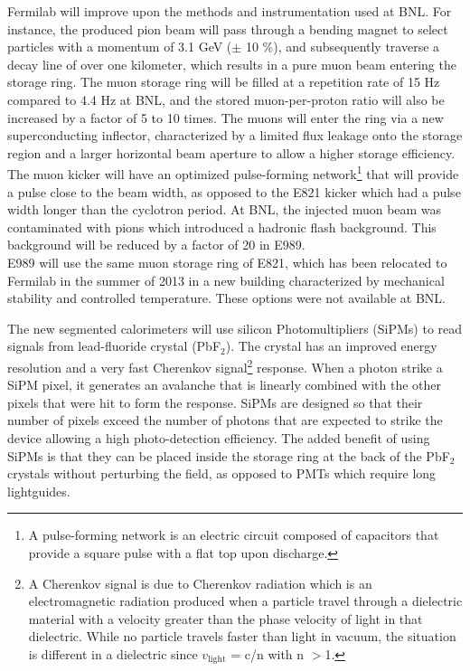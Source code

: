 \documentclass{outhesis}
\begin{document}
Fermilab will improve upon the methods and instrumentation used at BNL. For instance, the produced pion beam will pass through a bending magnet to select particles with a momentum of 3.1 GeV ($\pm$ 10 \%), and subsequently traverse a decay line of over one kilometer, which results in a pure muon beam entering the storage ring. The muon storage ring will be filled at a repetition rate of 15 Hz compared to 4.4 Hz at BNL, and the stored muon-per-proton ratio will also be increased by a factor of 5 to 10 times. The muons will enter the ring via a new superconducting inflector, characterized by a limited flux leakage onto the storage region and a larger horizontal beam aperture to allow a higher storage efficiency. The muon kicker will have an optimized pulse-forming network\footnote{A pulse-forming network is an electric circuit composed of capacitors that provide a square pulse with a flat top upon discharge.} that will provide a pulse close to the beam width, as opposed to the E821 kicker which had a pulse width longer than the cyclotron period. At BNL, the injected muon beam was contaminated with pions which introduced a hadronic flash background. This background will be reduced by a factor of 20 in E989. \\
E989 will use the same muon storage ring of E821, which has been relocated to Fermilab in the summer of 2013 in a new building characterized by mechanical stability and controlled temperature. These options were not available at BNL.

The new segmented calorimeters will use silicon Photomultipliers (SiPMs) to read signals from lead-fluoride crystal (PbF$_2$). The crystal has an improved energy resolution and a very fast Cherenkov signal\footnote{A Cherenkov signal is due to Cherenkov radiation which is an electromagnetic radiation produced when a particle travel through a dielectric material with a velocity greater than the phase velocity of light in that dielectric. While no particle travels faster than light in vacuum, the situation is different in a dielectric since $v_\text{light}$ = c/n with n $>$1.} response. When a photon strike a SiPM pixel, it generates an avalanche that is linearly combined with the other pixels that were hit to form the response. SiPMs are designed so that their number of pixels exceed the number of photons that are expected to strike the device allowing a high photo-detection efficiency. The added benefit of using SiPMs is that they can be placed inside the storage ring at the back of the PbF$_2$ crystals without perturbing the field, as opposed to PMTs which require long lightguides. 
\end{document}
